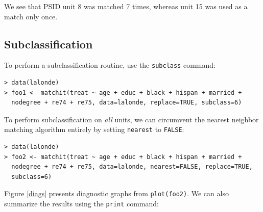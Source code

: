 \documentclass[oneside,letterpaper,titlepage]{article}
\begin{document}
We see that PSID unit 8 was matched 7 times, whereas unit 15 was used as a match only once.  

\subsection{Subclassification}

To perform a subclassification routine, use the \texttt{subclass}
command:

\begin{verbatim}
> data(lalonde) 
> foo1 <- matchit(treat ~ age + educ + black + hispan + married +
  nodegree + re74 + re75, data=lalonde, replace=TRUE, subclass=6)
\end{verbatim}

To perform subclassification on \emph{all} units, we can circumvent
the nearest neighbor matching algorithm entirely by setting
\texttt{nearest} to \texttt{FALSE}:

\begin{verbatim}
> data(lalonde) 
> foo2 <- matchit(treat ~ age + educ + black + hispan + married +
  nodegree + re74 + re75, data=lalonde, nearest=FALSE, replace=TRUE,
  subclass=6)
\end{verbatim}

Figure \ref{diags} presents diagnostic graphs from \texttt{plot(foo2)}.  
We can also summarize the results using the {\tt print} command:
\end{document}
